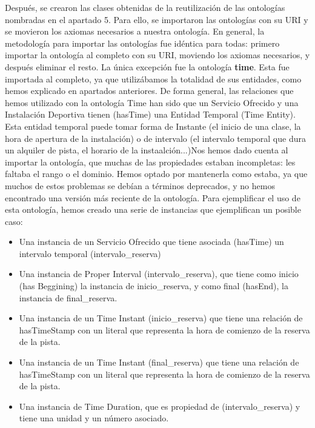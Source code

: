 \documentclass[a4paper,12pt]{article}
\begin{document}
	Después, se crearon las clases obtenidas de la reutilización de las ontologías nombradas en el apartado 5. Para ello, se importaron las ontologías con su URI y se movieron los axiomas necesarios a nuestra ontología. En general, la metodología para importar las ontologías fue idéntica para todas: primero importar la ontología al completo con su URI, moviendo los axiomas necesarios, y después eliminar el resto. La única excepción fue la ontología \textbf{time}. Esta fue importada al completo, ya que utilizábamos la totalidad de sus entidades, como hemos explicado en apartados anteriores. De forma general, las relaciones que hemos utilizado con la ontología Time han sido que un Servicio Ofrecido y una Instalación Deportiva tienen (hasTime) una Entidad Temporal (Time Entity). Esta entidad temporal puede tomar forma de Instante (el inicio de una clase, la hora de apertura de la instalación) o de intervalo (el intervalo temporal que dura un alquiler de pista, el horario de la instaalción...)Nos hemos dado cuenta al importar la ontología, que muchas de las propiedades estaban incompletas: les faltaba el rango o el dominio. Hemos optado por mantenerla como estaba, ya que muchos de estos problemas se debían a términos deprecados, y no hemos encontrado una versión más reciente de la ontología. Para ejemplificar el uso de esta ontología, hemos creado una serie de instancias que ejemplifican un posible caso:
	\begin{itemize}
	    \item Una instancia de un Servicio Ofrecido que tiene asociada (hasTime) un intervalo temporal (intervalo\_reserva)
	    \item Una instancia de Proper Interval (intervalo\_reserva), que tiene como inicio (has Beggining) la instancia de inicio\_reserva, y como final (hasEnd), la instancia de final\_reserva.
	    \item Una instancia de un Time Instant (inicio\_reserva) que tiene una relación de hasTimeStamp con un literal que representa la hora de comienzo de la reserva de la pista.
	    \item Una instancia de un Time Instant (final\_reserva) que tiene una relación de hasTimeStamp con un literal que representa la hora de comienzo de la reserva de la pista.
	    \item Una instancia de Time Duration, que es propiedad de (intervalo\_reserva) y tiene una unidad y un número asociado. 
	    
	\end{itemize}
	
\end{document}
